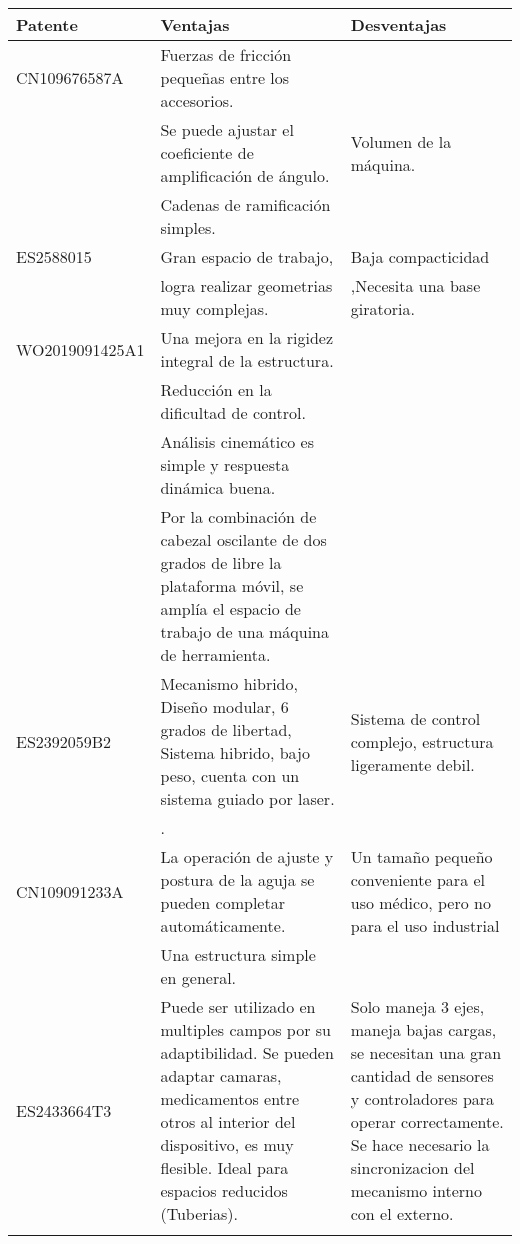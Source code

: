 \begin{longtable}{|>{\columncolor[gray]{0.85}}p{}|p{}|p{}|}
\hline \rowcolor[gray]{0.85}
\textbf{\large Patente} & \textbf{\large Ventajas} & \textbf{\large Desventajas} \\ \hline \endhead
CN109676587A & Fuerzas de fricción pequeñas entre los accesorios. & \\
 & Se puede ajustar el coeficiente de amplificación de ángulo. & Volumen de la máquina. \\
 & Cadenas de ramificación simples. & \\ \cline{1-3}
 
ES2588015 & Gran espacio de trabajo, & Baja compacticidad \\
 & logra realizar geometrias muy complejas. & ,Necesita una base giratoria. \\ \cline{1-3}
 
WO2019091425A1 & Una mejora en la rigidez integral de la estructura. & \\
 & Reducción en la dificultad de control. & \\
 & Análisis cinemático es simple y respuesta dinámica buena. & \\
 & Por la combinación de cabezal oscilante de dos grados de libre la plataforma móvil, se amplía el espacio de trabajo de una máquina de herramienta. & \\ \cline{1-3}
 
ES2392059B2 & Mecanismo hibrido, Diseño modular, 6 grados de libertad, Sistema hibrido, bajo peso, cuenta con un sistema guiado por laser. & Sistema de control complejo, estructura ligeramente debil.\\
 & . & \\ \cline{1-3}
 
CN109091233A & La operación de ajuste y postura de la aguja se pueden completar automáticamente. & Un tamaño pequeño conveniente para el uso médico, pero no para el uso industrial \\
 & Una estructura simple en general. &  \\ \cline{1-3}

ES2433664T3 & Puede ser utilizado en multiples campos por su adaptibilidad. Se pueden adaptar camaras, medicamentos entre otros al interior del dispositivo, es muy flesible. Ideal para espacios reducidos (Tuberias). & Solo maneja 3 ejes, maneja bajas cargas, se necesitan una gran cantidad de sensores y controladores para operar correctamente. Se hace necesario la sincronizacion del mecanismo interno con el externo.
  \\ \cline{1-3}


\end{longtable}
